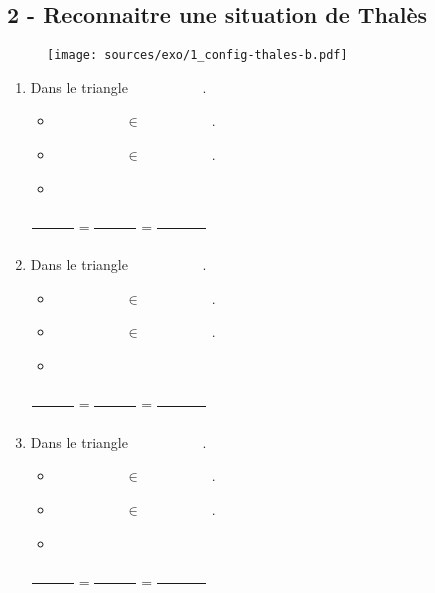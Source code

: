 \documentclass[11pt]{article}
\begin{document}
\vspace{2cm}

\subsection*{2 - Reconnaitre une situation de Thalès}

\begin{figure}[H]
  \centering
  \texttt{[image: sources/exo/1\_config-thales-b.pdf]}
\end{figure}

\begin{multicols}{3}
\begin{enumerate}

\item Dans le triangle $\phantom{1234567890}$.
  \begin{itemize}   
  \item $\phantom{1234567890} \in \phantom{1234567890}$.
  \item $\phantom{1234567890} \in \phantom{1234567890}$.
  \item \phantom{123456}
  \end{itemize}
  
  $\dfrac{\phantom{123456}}{\phantom{123456}} = \dfrac{\phantom{123456}}{\phantom{123456}} = \dfrac{\phantom{1234567}}{\phantom{123456}} $

\item Dans le triangle $\phantom{1234567890}$.
  \begin{itemize}   
  \item $\phantom{1234567890} \in \phantom{1234567890}$.
  \item $\phantom{1234567890} \in \phantom{1234567890}$.
  \item \phantom{123456}
  \end{itemize}

  $\dfrac{\phantom{123456}}{\phantom{123456}} = \dfrac{\phantom{123456}}{\phantom{123456}} = \dfrac{\phantom{1234567}}{\phantom{123456}} $

\item Dans le triangle $\phantom{1234567890}$.
  \begin{itemize}   
  \item $\phantom{1234567890} \in \phantom{1234567890}$.
  \item $\phantom{1234567890} \in \phantom{1234567890}$.
  \item \phantom{123456}
  \end{itemize}

  $\dfrac{\phantom{123456}}{\phantom{123456}} = \dfrac{\phantom{123456}}{\phantom{123456}} = \dfrac{\phantom{1234567}}{\phantom{123456}} $ 
\end{enumerate}
\end{multicols}
\end{document}
